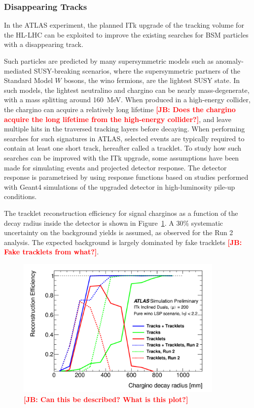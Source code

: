 \subsubsection{Disappearing Tracks} 

In the ATLAS experiment, the planned ITk upgrade of the tracking volume for the HL-LHC can be exploited to improve the existing searches for BSM particles with a disappearing track.

Such particles are predicted by many supersymmetric models such as anomaly-mediated SUSY-breaking scenarios, where the supersymmetric partners of the Standard Model $W$ bosons, the wino fermions, are the lightest SUSY state. In such models, the lightest neutralino and chargino can be nearly mass-degenerate, with a mass splitting around 160~MeV. When produced in a high-energy collider, the chargino can acquire a relatively long lifetime {\bf \textcolor{red}{[JB: Does the chargino acquire the long lifetime from the high-energy collider?]}}, and leave multiple hits in the traversed tracking layers before decaying. When performing searches for such signatures in ATLAS, selected events are typically required to contain at least one short track, hereafter called a tracklet. To study how such searches can be improved with the ITk upgrade, some assumptions have been made for simulating events and projected detector response. The detector response is parametrised by using response functions based on studies performed with Geant4 simulations of the upgraded detector in high-luminosity pile-up conditions.

The tracklet reconstruction efficiency for signal charginos as a function of the decay radius inside the detector is shown in Figure~\ref{fig:ATLAS_DT1}. A 30\% systematic uncertainty on the background yields is assumed, as observed for the Run 2 analysis. The expected background is largely dominated by fake tracklets {\bf \textcolor{red}{[JB: Fake tracklets from what?]}}.
%
\begin{figure}[t]\begin{center}
\includegraphics[width=0.9\textwidth]{figures/ch03_fig_039.png}
\caption{ {\bf \textcolor{red}{[JB: Can this be described?  What is this plot?]}} }
\label{fig:ATLAS_DT1}
\end{center}
\end{figure}

